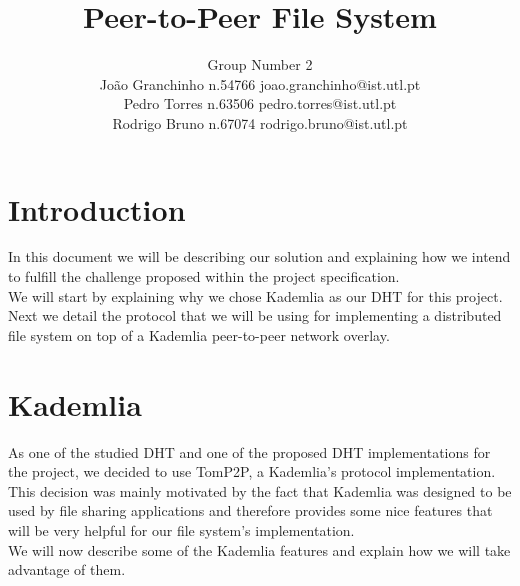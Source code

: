 \documentclass[times,9pt,article]{llncs}
\begin{document}
\title{Peer-to-Peer File System}

\author{Group Number 2 \\
Jo\~ao Granchinho n.54766 joao.granchinho@ist.utl.pt \\
Pedro Torres  n.63506 pedro.torres@ist.utl.pt \\
Rodrigo Bruno n.67074 rodrigo.bruno@ist.utl.pt}
\maketitle


\section{Introduction}
In this document we will be describing our solution and explaining how we intend
to fulfill the challenge proposed within the project specification.\\
We will start by explaining why we chose Kademlia as our DHT for this project.
Next we detail the protocol that we will be using for implementing a distributed
file system on top of a Kademlia peer-to-peer network overlay.

\section{Kademlia}

As one of the studied DHT and one of the proposed DHT implementations for the 
project, we decided to use TomP2P, a Kademlia's protocol implementation.\\
This decision was mainly motivated by the fact that Kademlia was designed to be
used by file sharing applications and therefore provides some nice features that
will be very helpful for our file system's implementation. \\
We will now describe some of the Kademlia features and explain how we will take 
advantage of them. 
\end{document}
